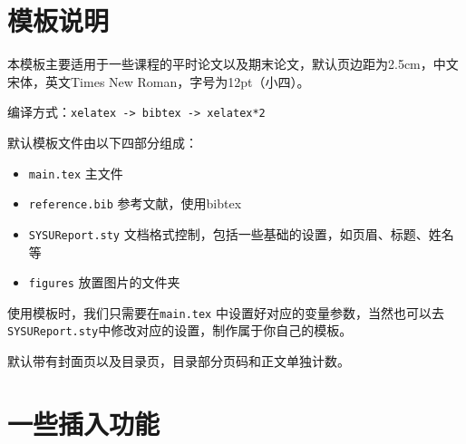 \documentclass{SYSUReport}
\date{\today}
\begin{document}
\cover

%
%

\thispagestyle{empty} %

\newpage
\setcounter{page}{1}
\tableofcontents

\newpage
\setcounter{page}{1}


\section{模板说明}
本模板主要适用于一些课程的平时论文以及期末论文，默认页边距为2.5cm，中文宋体，英文Times New Roman，字号为12pt（小四）。

编译方式：\verb|xelatex -> bibtex -> xelatex*2|


默认模板文件由以下四部分组成：
\begin{itemize}
    \item \texttt{main.tex} 主文件
    \item \texttt{reference.bib} 参考文献，使用bibtex
    \item \texttt{SYSUReport.sty} 文档格式控制，包括一些基础的设置，如页眉、标题、姓名等
    \item \texttt{figures} 放置图片的文件夹
\end{itemize}

使用模板时，我们只需要在\texttt{main.tex} 中设置好对应的变量参数，当然也可以去\texttt{SYSUReport.sty}中修改对应的设置，制作属于你自己的模板。

默认带有封面页以及目录页，目录部分页码和正文单独计数。

\section{一些插入功能}
\end{document}
